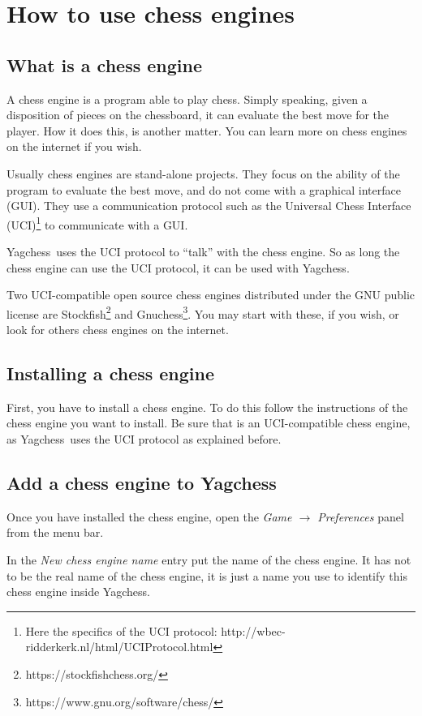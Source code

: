 \documentclass[a4paper]{article}
\newcommand{\nameprog}{Yagchess}
\begin{document}
\section{How to use chess engines}
\label{howce}
\subsection{What is a chess engine}
A chess engine is a program able to play chess. Simply speaking, given a disposition of pieces on the chessboard, it can evaluate the best move for the player.
How it does this, is another matter. You can learn more on chess engines on the internet if you wish.

Usually chess engines are stand-alone projects. They focus on the ability of the program to evaluate the best move, and do not come with a graphical interface (GUI).
They use a communication protocol such as the Universal Chess Interface (UCI)\footnote{Here the specifics of the UCI protocol: http://wbec-ridderkerk.nl/html/UCIProtocol.html}
to communicate with a GUI.

\nameprog\ uses the UCI protocol to ``talk'' with the chess engine. So as long the chess engine can use the UCI protocol, it can be used with \nameprog.

Two UCI-compatible open source chess engines distributed under the GNU public license are Stockfish\footnote{https://stockfishchess.org/}
and Gnuchess\footnote{https://www.gnu.org/software/chess/}. You may start with these, if you wish, or look for others chess engines on the internet.


\subsection{Installing a chess engine}
First, you have to install a chess engine. To do this follow the instructions of the chess engine you want to install. Be sure that is an UCI-compatible chess engine,
as \nameprog\ uses the UCI protocol as explained before.


\subsection{Add a chess engine to \nameprog}
Once you have installed the chess engine, open the \textit{Game $\rightarrow$ Preferences} panel from the menu bar.

In the \textit{New chess engine name} entry put the name of the chess engine. It has not to be the real name of the chess engine,
it is just a name you use to identify this chess engine inside \nameprog.
\end{document}
